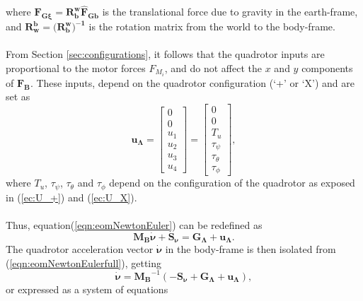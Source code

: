 where $\mathbf{F_{G\xi}}=\mathbf{R_{b}^{w}}\mathbf{\hat{F}_{Gb}}$ is the translational force due to  gravity in the earth-frame, and $\mathbf{R_{w}^{b}} = (\mathbf{R_{b}^{w})^{-1}}$ is the rotation matrix from the world to the body-frame.
\\\\
From Section \ref{sec:configurations}, it follows that the quadrotor inputs are proportional to the motor forces $F_{M_i}$, and do not affect the $x$ and $y$ components of $\mathbf{F_B}$. These inputs, depend on the quadrotor configuration (`+' or `X') and are set as
\begin{equation}
\mathbf{u_{\Lambda}} = \begin{bmatrix}
0 \\[5pt] 0 \\[5pt] u_1 \\[5pt] u_2 \\[5pt] u_3 \\[5pt] u_4
\end{bmatrix} = \begin{bmatrix}
0 \\[5pt] 0 \\[5pt] T_u\\[5pt]
	\tau_{\psi}\\[5pt]
	\tau_{\theta}\\[5pt]
	\tau_{\phi}
\end{bmatrix},
\end{equation}
where $T_u$, $\tau_\psi$, $\tau_\theta$ and $\tau_\phi$ depend on the configuration of the quadrotor as exposed in (\ref{ec:U_+}) and (\ref{ec:U_X}).
\\\\
Thus, equation(\ref{eqn:eomNewtonEuler}) can be redefined as
\begin{equation}
\label{eqn:eomNewtonEulerfull}
\mathbf{M_{B}}\mathbf{\dot{\nu}} + \mathbf{S_\nu} = \mathbf{G_{\Lambda}} + \mathbf{u_{\Lambda}}.
\end{equation}
The quadrotor acceleration vector $\mathbf{\dot{\nu}}$ in the body-frame is then isolated from (\ref{eqn:eomNewtonEulerfull}), getting
\begin{equation}
\mathbf{\dot{\nu}} = \mathbf{M_{B}}^{-1}(-\mathbf{S_\nu} + \mathbf{G_{\Lambda}} + \mathbf{u_{\Lambda}}),
\end{equation}
or expressed as a system of equations
